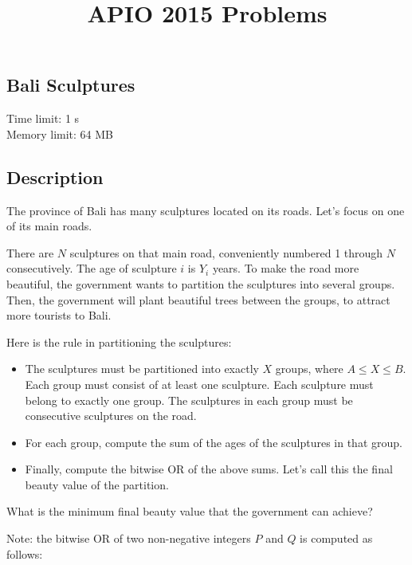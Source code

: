 \documentclass{report}
\title{APIO 2015 Problems}
\begin{document}
\maketitle

\newpage
\begin{center}
\section*{Bali Sculptures}
Time limit: 1 s\\
Memory limit: 64 MB
\end{center}

\subsection*{Description}

The province of Bali has many sculptures located on its roads. Let's focus on one of its main roads.

There are $N$ sculptures on that main road, conveniently numbered 1 through $N$ consecutively. The age of sculpture $i$ is $Y_{i}$ years. To make the road more beautiful, the government wants to partition the sculptures into several groups. Then, the government will plant beautiful trees between the groups, to attract more tourists to Bali.

Here is the rule in partitioning the sculptures:
\begin{itemize} \itemsep1pt \parskip0pt
\item The sculptures must be partitioned into exactly $X$ groups, where $A \le X \le B$. Each group must consist of at least one sculpture. Each sculpture must belong to exactly one group. The sculptures in each group must be consecutive sculptures on the road.
\item For each group, compute the sum of the ages of the sculptures in that group.
\item Finally, compute the bitwise OR of the above sums. Let's call this the final beauty value of the partition.
\end{itemize}

What is the minimum final beauty value that the government can achieve?

Note: the bitwise OR of two non-negative integers $P$ and $Q$ is computed as follows:
\end{document}
